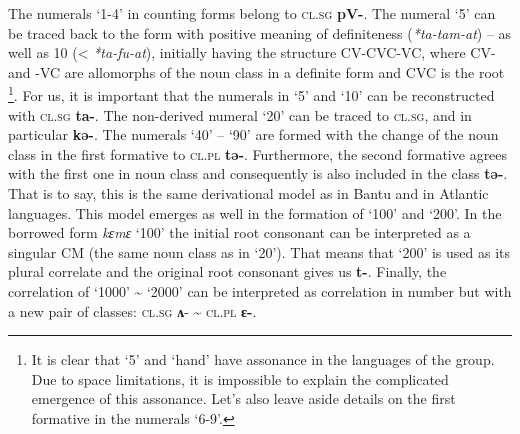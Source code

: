 \begin{table}
\caption{\label{tab:1:15} Noun classes in Temne numerals}
\end{table}

The numerals ‘1-4’ in counting forms belong to \textsc{cl}.\textsc{sg} \textbf{pV-}. The numeral ‘5’ can be traced back to the form with positive meaning of definiteness (\textit{*ta-tam-at}) – as well as 10 (< \textit{*ta-fu-at}), initially having the structure CV-CVC-VC, where CV-  and  -VC  are allomorphs of the noun class in a definite form and CVC is the root \citep[143-144]{Pozdniakov1993}\footnote{It is clear that `5' and `hand' have assonance in the languages of the group. Due to space limitations, it is impossible to explain the complicated emergence of this assonance. Let's also leave aside details on the first formative in the numerals ‘6-9’.}. For us, it is important that the numerals in ‘5’ and ‘10’ can be reconstructed with \textsc{cl}.\textsc{sg} \textbf{ta-}. The non-derived numeral `20' can be traced to \textsc{cl}.\textsc{sg}, and  in particular \textbf{kə-}. The numerals ‘40’ – ‘90’ are formed with the change of the noun class in the first formative to \textsc{cl}.\textsc{pl} \textbf{tə-}. Furthermore, the second formative agrees with the first one in noun class and consequently is also included in the class \textbf{tə-}. That is to say, this is the same derivational model as in Bantu and in Atlantic languages. This model emerges as well in the formation of ‘100’ and ‘200’. In the borrowed form \textit{kɛmɛ} ‘100’ the initial root consonant can be interpreted as a singular CM (the same noun class as in ‘20’). That means that ‘200’ is used as its plural correlate and the original root consonant gives us \textbf{t-}. Finally, the correlation of ‘1000’ {\textasciitilde} ‘2000’ can be interpreted as correlation in number but with a new pair of classes: \textsc{cl}.\textsc{sg} \textbf{ʌ}- {\textasciitilde} \textsc{cl}.\textsc{pl} \textbf{ɛ-}.

